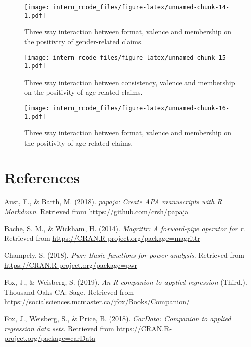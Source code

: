 \documentclass[man]{apa6}
\begin{document}
\begin{figure}
\centering
\texttt{[image: intern\_rcode\_files/figure-latex/unnamed-chunk-14-1.pdf]}
\caption{\label{fig:unnamed-chunk-14}Three way interaction between format,
valence and membership on the positivity of gender-related claims.}
\end{figure}

\begin{figure}
\centering
\texttt{[image: intern\_rcode\_files/figure-latex/unnamed-chunk-15-1.pdf]}
\caption{\label{fig:unnamed-chunk-15}Three way interaction between
consistency, valence and membership on the positivity of age-related
claims.}
\end{figure}

\begin{figure}
\centering
\texttt{[image: intern\_rcode\_files/figure-latex/unnamed-chunk-16-1.pdf]}
\caption{\label{fig:unnamed-chunk-16}Three way interaction between format,
valence and membership on the positivity of age-related claims.}
\end{figure}

\newpage

\section{References}\label{references}

\begingroup
\setlength{\parindent}{-0.5in} \setlength{\leftskip}{0.5in}

\hypertarget{refs}{}
\hypertarget{ref-R-papaja}{}
Aust, F., \& Barth, M. (2018). \emph{papaja: Create APA manuscripts with
R Markdown}. Retrieved from \url{https://github.com/crsh/papaja}

\hypertarget{ref-R-magrittr}{}
Bache, S. M., \& Wickham, H. (2014). \emph{Magrittr: A forward-pipe
operator for r}. Retrieved from
\url{https://CRAN.R-project.org/package=magrittr}

\hypertarget{ref-R-pwr}{}
Champely, S. (2018). \emph{Pwr: Basic functions for power analysis}.
Retrieved from \url{https://CRAN.R-project.org/package=pwr}

\hypertarget{ref-R-car}{}
Fox, J., \& Weisberg, S. (2019). \emph{An R companion to applied
regression} (Third.). Thousand Oaks CA: Sage. Retrieved from
\url{https://socialsciences.mcmaster.ca/jfox/Books/Companion/}

\hypertarget{ref-R-carData}{}
Fox, J., Weisberg, S., \& Price, B. (2018). \emph{CarData: Companion to
applied regression data sets}. Retrieved from
\url{https://CRAN.R-project.org/package=carData}
\end{document}
